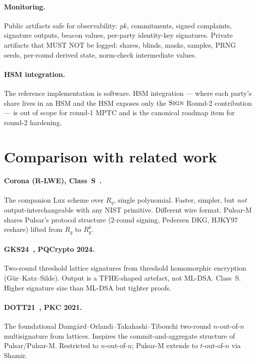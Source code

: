 \documentclass[11pt,a4paper]{article}
\theoremstyle{definition}
\theoremstyle{remark}
\newcommand{\Rq}{R_q}
\newcommand{\Sign}{\textsc{Sign}}
\begin{document}
\paragraph{Monitoring.}
Public artifacts safe for observability: $\mathit{pk}$, commitments,
signed complaints, signature outputs, beacon values, per-party
identity-key signatures. Private artifacts that MUST NOT be logged:
shares, blinds, masks, samples, PRNG seeds, per-round derived state,
norm-check intermediate values.

\paragraph{HSM integration.}
The reference implementation is software. HSM integration --- where
each party's share lives in an HSM and the HSM exposes only the
$\Sign$ Round-2 contribution --- is out of scope for round-1 MPTC
and is the canonical roadmap item for round-2 hardening.

\section{Comparison with related work}
\label{sec:related}

\paragraph{Corona (R-LWE), Class~S~\cite{boschini2024corona}.}
The companion Lux scheme over $\Rq$, single polynomial. Faster,
simpler, but \emph{not} output-interchangeable with any NIST primitive.
Different wire format. Pulsar-M shares Pulsar's protocol structure
(2-round signing, Pedersen DKG, HJKY97 reshare) lifted from $\Rq$ to
$\Rq^k$.

\paragraph{GKS24~\cite{gks24}, PQCrypto 2024.}
Two-round threshold lattice signatures from threshold homomorphic
encryption (G\"ur--Katz--Silde). Output is a TFHE-shaped artefact, not
ML-DSA. Class~S. Higher signature size than ML-DSA but tighter
proofs.

\paragraph{DOTT21~\cite{dott21}, PKC 2021.}
The foundational Damg\aa rd--Orlandi--Takahashi--Tibouchi two-round
$n$-out-of-$n$ multisignature from lattices. Inspires the
commit-and-aggregate structure of Pulsar/Pulsar-M. Restricted to
$n$-out-of-$n$; Pulsar-M extends to $t$-out-of-$n$ via Shamir.
\end{document}
